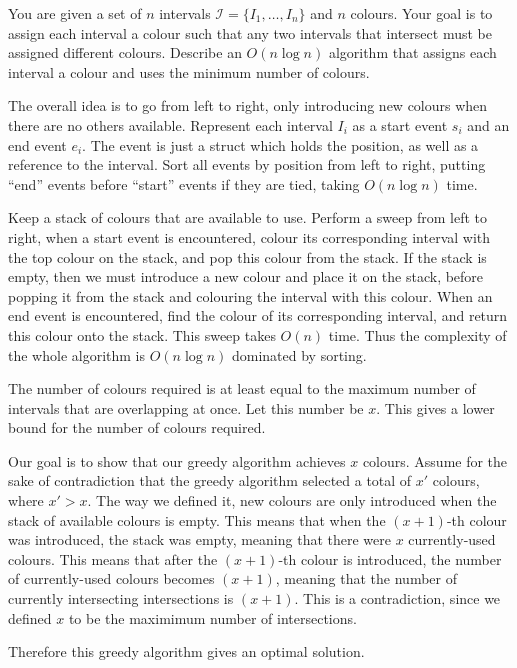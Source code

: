 \documentclass{article}
\begin{document}
\begin{question}
You are given a set of $n$ intervals $\mathcal I = \{I_1, \dots, I_n\}$ and $n$ colours. Your goal is to assign each interval a colour such that any two intervals that intersect must be assigned different colours. Describe an $O(n \log n)$ algorithm that assigns each interval a colour and uses the minimum number of colours.
\end{question}

\begin{solution}
    The overall idea is to go from left to right, only introducing new colours when 
    there are no others available.
    Represent each interval $I_i$ as a start event $s_i$ and an end event $e_i$.
    The event is just a struct which holds the position, as well as a reference to the interval.
    Sort all events by position from left to right, putting ``end'' events before ``start'' events if they are tied, taking $O(n\log n)$ time.

    Keep a stack of colours that are available to use.
    Perform a sweep from left to right,
    when a start event is encountered, colour its corresponding interval with 
    the top colour on the stack, and pop this colour from the stack.
    If the stack is empty, then we must introduce a new colour and place it on the stack, 
    before popping it from the stack and colouring the interval with this colour.
    When an end event is encountered, find the colour of its corresponding interval, 
    and return this colour onto the stack.
    This sweep takes $O(n)$ time. Thus the complexity of the whole algorithm is $O(n\log n)$ dominated by sorting.

    The number of colours required is at least equal to the maximum number of intervals that are overlapping at once.
    Let this number be $x$.
    This gives a lower bound for the number of colours required.

    Our goal is to show that our greedy algorithm achieves $x$ colours.
    Assume for the sake of contradiction that the greedy algorithm selected a total of $x'$ colours, where $x' > x$.
    The way we defined it, new colours are only introduced when the stack of available colours is empty.
    This means that when the $(x+1)$-th colour was introduced, the stack was empty, meaning that 
    there were $x$ currently-used colours. This means that after the $(x+1)$-th colour is introduced,
    the number of currently-used colours becomes $(x+1)$, meaning that the number of currently intersecting 
    intersections is $(x+1)$. This is a contradiction, since we defined $x$ to be the maximimum number of intersections.

    Therefore this greedy algorithm gives an optimal solution.








\end{solution}
\end{document}
